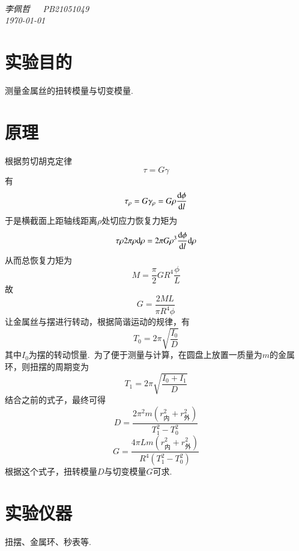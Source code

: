 \documentclass[a4paper]{article}%
\title{\heiti{实验报告}}%
\author{{\emph{李佩哲}}}
\date{\emph{\small\today}}
\begin{document}
\begin{center}
\\
\emph{李佩哲~~~PB21051049~~~\\\today}
\end{center}
\section{实验目的}
测量金属丝的扭转模量与切变模量.

\section{原理}
根据剪切胡克定律$$\tau=G\gamma$$有$$\tau_\rho=G\gamma_\rho=G\rho \frac{\text d\phi}{\text dl}$$
于是横截面上距轴线距离$\rho$处切应力恢复力矩为$$\tau \rho 2\pi\rho\text d\rho=2\pi G\rho^3\frac{\text d\phi}{\text dl}\text d\rho$$
从而总恢复力矩为$$M=\frac{\pi}{2}GR^4\frac{\phi}{L}$$
故$$G=\frac{2ML}{\pi R^4\phi}$$
让金属丝与摆进行转动，根据简谐运动的规律，有$$T_0=2\pi \sqrt{\frac{I_0}{D}}$$
其中$I_0$为摆的转动惯量.~为了便于测量与计算，在圆盘上放置一质量为$m$的金属环，则扭摆的周期变为$$T_1=2\pi\sqrt{\frac{I_0+I_1}{D}}$$
结合之前的式子，最终可得$$D=\frac{2\pi^2m\left(r_{\text{内}}^2+r_{\text{外}}^2\right)}{T_1^2-T_0^2}$$
$$G=\frac{4\pi Lm\left(r_{\text{内}}^2+r_{\text{外}}^2\right)}{R^4\left(T_1^2-T_0^2\right)}$$
根据这个式子，扭转模量$D$与切变模量$G$可求.

\section{实验仪器}
扭摆、金属环、秒表等.
\end{document}
